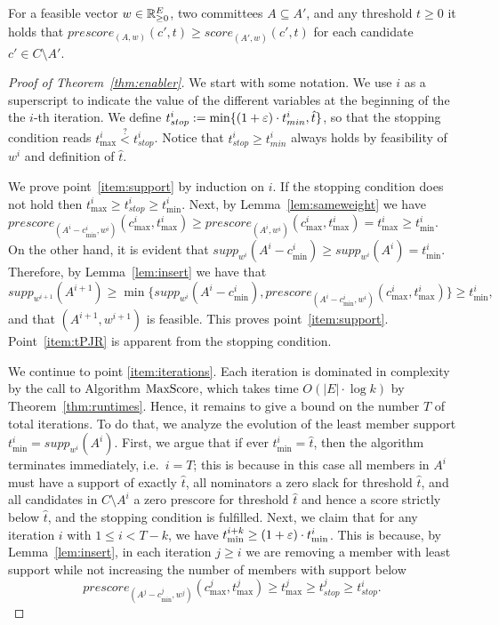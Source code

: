\begin{lemma}\label{lem:sameweight}
For a feasible vector $w\in \mathbb{R}_{\geq 0}^E$, two committees $A\subseteq A'$, and any threshold $t\geq 0$ it holds that $prescore_{(A,w)}(c',t)\geq score_{(A',w)}(c',t)$ for each candidate $c'\in C\setminus A'$.
\end{lemma}

\begin{proof}[Proof of Theorem~\ref{thm:enabler}]
We start with some notation. We use $i$ as a superscript to indicate the value of the different variables at the beginning of the the $i$-th iteration. We define $t^i_{stop}:=\min\{(1+\varepsilon)\cdot t^i_{min}, \hat{t}\}$, so that the stopping condition reads $t^i_{\max} \stackrel{?}{<} t^i_{stop}$. Notice that $t^i_{stop}\geq t^i_{min}$ always holds by feasibility of $w^i$ and definition of $\hat{t}$. 

We prove point~\ref{item:support} by induction on $i$. 
If the stopping condition does not hold then $t^i_{\max} \geq t^i_{stop}\geq t^i_{\min}$. 
Next, by Lemma~\ref{lem:sameweight} we have $prescore_{(A^i-c_{\min}^i, w^i)}(c^i_{\max}, t^i_{\max}) \geq prescore_{(A^i, w^i)}(c^i_{\max}, t^i_{\max})=t^i_{\max}\geq t^i_{\min}$. 
On the other hand, it is evident that $supp_{w^i}(A^i-c^i_{\min})\geq supp_{w^i}(A^i)=t^i_{\min}$. 
Therefore, by Lemma~\ref{lem:insert} we have that  
$$supp_{w^{i+1}}(A^{i+1})\geq \min\{supp_{w^i}(A^i-c^i_{\min}), prescore_{(A^i-c_{\min}^i, w^i)}(c^i_{\max}, t^i_{\max})\} \geq t^i_{\min},$$
and that $(A^{i+1},w^{i+1})$ is feasible.  
This proves point~\ref{item:support}. Point~\ref{item:tPJR} is apparent from the stopping condition. 

We continue to point \ref{item:iterations}. Each iteration is dominated in complexity by the call to Algorithm $\operatorname{MaxScore}$, which takes time $O(|E|\cdot \log k)$ by Theorem~\ref{thm:runtimes}. 
Hence, it remains to give a bound on the number $T$ of total iterations. 
To do that, we analyze the evolution of the least member support $t^i_{\min}=supp_{w^i}(A^i)$. First, we argue that if ever $t^i_{\min}=\hat{t}$, then the algorithm terminates immediately, i.e.~$i=T$; this is because in this case all members in $A^i$ must have a support of exactly $\hat{t}$, all nominators a zero slack for threshold $\hat{t}$, and all candidates in $C\setminus A^i$ a zero prescore for threshold $\hat{t}$ and hence a score strictly below $\hat{t}$, and the stopping condition is fulfilled.
Next, we claim that for any iteration $i$ with $1\leq i<T-k$, we have $t^{i+k}_{\min}\geq (1+\varepsilon)\cdot t^{i}_{\min}$. This is because, by Lemma~\ref{lem:insert}, in each iteration $j\geq i$ we are removing a member with least support while not increasing the number of members with support below 
$$prescore_{(A^j - c^j_{\min}, w^j)}(c^j_{\max}, t^j_{\max})\geq t^j_{\max}\geq t^j_{stop}\geq t^i_{stop}.$$
 

\end{proof}
